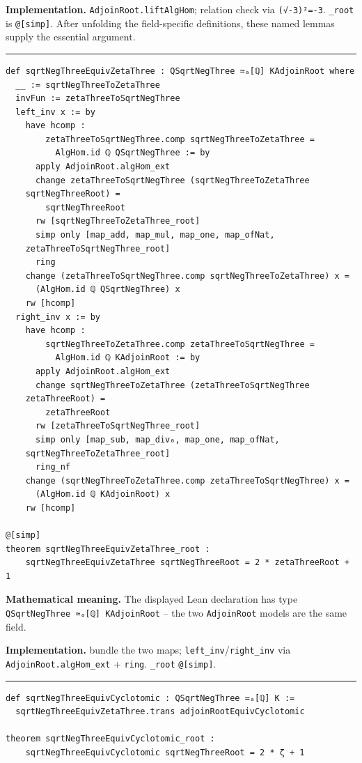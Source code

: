 \documentclass[UTF8,a4paper,11pt,fontset=fandol]{ctexart}
\theoremstyle{definition}
\newcommand{\statementsep}{\par\medskip\hrule\medskip}
\begin{document}
\noindent\textbf{Implementation.} \texttt{AdjoinRoot.\allowbreak{}liftAlgHom}; relation check via \texttt{(√-3)²=-3}. \texttt{\_\allowbreak{}root} is \texttt{@[simp]}. After unfolding the field-specific definitions, these named lemmas supply the essential argument.\par
\statementsep
\begin{verbatim}
def sqrtNegThreeEquivZetaThree : QSqrtNegThree ≃ₐ[ℚ] KAdjoinRoot where
  __ := sqrtNegThreeToZetaThree
  invFun := zetaThreeToSqrtNegThree
  left_inv x := by
    have hcomp :
        zetaThreeToSqrtNegThree.comp sqrtNegThreeToZetaThree =
          AlgHom.id ℚ QSqrtNegThree := by
      apply AdjoinRoot.algHom_ext
      change zetaThreeToSqrtNegThree (sqrtNegThreeToZetaThree
    sqrtNegThreeRoot) =
        sqrtNegThreeRoot
      rw [sqrtNegThreeToZetaThree_root]
      simp only [map_add, map_mul, map_one, map_ofNat,
    zetaThreeToSqrtNegThree_root]
      ring
    change (zetaThreeToSqrtNegThree.comp sqrtNegThreeToZetaThree) x =
      (AlgHom.id ℚ QSqrtNegThree) x
    rw [hcomp]
  right_inv x := by
    have hcomp :
        sqrtNegThreeToZetaThree.comp zetaThreeToSqrtNegThree =
          AlgHom.id ℚ KAdjoinRoot := by
      apply AdjoinRoot.algHom_ext
      change sqrtNegThreeToZetaThree (zetaThreeToSqrtNegThree
    zetaThreeRoot) =
        zetaThreeRoot
      rw [zetaThreeToSqrtNegThree_root]
      simp only [map_sub, map_div₀, map_one, map_ofNat,
    sqrtNegThreeToZetaThree_root]
      ring_nf
    change (sqrtNegThreeToZetaThree.comp zetaThreeToSqrtNegThree) x =
      (AlgHom.id ℚ KAdjoinRoot) x
    rw [hcomp]

@[simp]
theorem sqrtNegThreeEquivZetaThree_root :
    sqrtNegThreeEquivZetaThree sqrtNegThreeRoot = 2 * zetaThreeRoot + 1
\end{verbatim}
\noindent\textbf{Mathematical meaning.} The displayed Lean declaration has type \texttt{QSqrtNegThree ≃ₐ[ℚ] KAdjoinRoot} -- the two \texttt{AdjoinRoot} models are the same field.\par
\noindent\textbf{Implementation.} bundle the two maps; \texttt{left\_\allowbreak{}inv}/\texttt{right\_\allowbreak{}inv} via \texttt{AdjoinRoot.\allowbreak{}algHom\_\allowbreak{}ext} + \texttt{ring}. \texttt{\_\allowbreak{}root} \texttt{@[simp]}.\par
\statementsep
\begin{verbatim}
def sqrtNegThreeEquivCyclotomic : QSqrtNegThree ≃ₐ[ℚ] K :=
  sqrtNegThreeEquivZetaThree.trans adjoinRootEquivCyclotomic

theorem sqrtNegThreeEquivCyclotomic_root :
    sqrtNegThreeEquivCyclotomic sqrtNegThreeRoot = 2 * ζ + 1
\end{verbatim}
\end{document}
